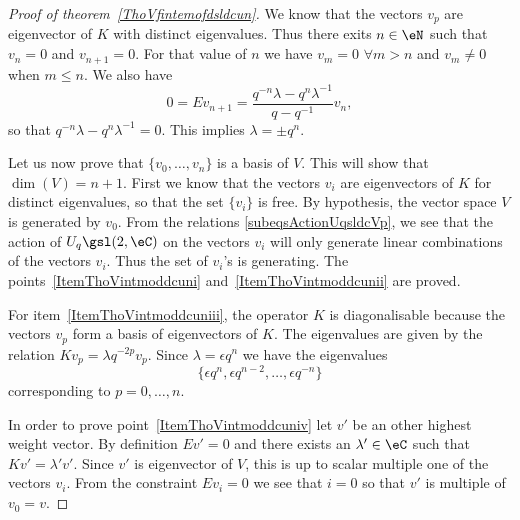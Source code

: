 \begin{proof}[Proof of theorem~\ref{ThoVfintemofdsldcun}]
	We know that the vectors \( v_p\) are eigenvector of \( K\) with distinct eigenvalues. Thus there exits \( n\in\eN\) such that \( v_n=0\) and \( v_{n+1}=0\). For that value of \( n\) we have \( v_m=0\) \( \forall m>n\) and \( v_m\neq 0\) when \( m\leq n\). We also have
	\begin{equation}
		0=Ev_{n+1}=\frac{ q^{-n}\lambda-q^n\lambda^{-1} }{ q-q^{-1} }v_n,
	\end{equation}
	so that \( q^{-n}\lambda- q^n\lambda^{-1}=0\). This implies \( \lambda=\pm q^n\).

	Let us now prove that \( \{ v_0,\ldots,v_n \}\) is a basis of \( V\). This will show that \( \dim(V)=n+1\). First we know that the vectors \( v_i\) are eigenvectors of \( K\) for distinct eigenvalues, so that the set \( \{ v_i \}\) is free. By hypothesis, the vector space \( V\) is generated by \( v_0\). From the relations \eqref{subeqsActionUqsldcVp}, we see that the action of \( U_q\gsl(2,\eC)\) on the vectors \( v_i\) will only generate linear combinations of the vectors \( v_i\). Thus the set of \( v_i\)'s is generating. The points~\ref{ItemThoVintmoddcuni} and~\ref{ItemThoVintmoddcunii} are proved.

	For item~\ref{ItemThoVintmoddcuniii}, the operator \( K\) is diagonalisable because the vectors \( v_p\) form a basis of eigenvectors of \( K\). The eigenvalues are given by the relation \( Kv_p=\lambda q^{-2p}v_p\). Since \( \lambda=\epsilon q^n\) we have the eigenvalues
	\begin{equation}
		\{ \epsilon q^n,\epsilon q^{n-2},\ldots,\epsilon q^{-n} \}
	\end{equation}
	corresponding to \( p=0,\ldots,n\).

	In order to prove point~\ref{ItemThoVintmoddcuniv} let \( v'\) be an other highest weight vector. By definition \( Ev'=0\) and there exists an \( \lambda'\in\eC\) such that \( Kv'=\lambda'v'\). Since \( v'\) is eigenvector of \( V\), this is up to scalar multiple one of the vectors \( v_i\). From the constraint \( Ev_i=0\) we see that \( i=0\) so that \( v'\) is multiple of \( v_0=v\).

\end{proof}

